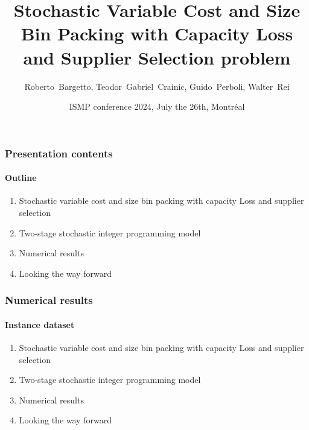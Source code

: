 \documentclass[8pt,xcolor={dvipsnames}]{beamer}
\title[SVCSBPP-CL-SS]
{ \textbf { Stochastic Variable Cost and Size Bin Packing with Capacity Loss and Supplier Selection problem} }
\author[R.~Bargetto, T.~G.~Crainic, G.~Perboli, W.~Rei]
{Roberto~Bargetto, Teodor~Gabriel~Crainic, Guido~Perboli, Walter~Rei}
\institute[PoliTo]
{
	Politecnico di Torino
}
\date[ISMP conference 2024]{ISMP conference 2024, July the 26th, Montréal}
\begin{document}
 
\frame{\titlepage}
 
\begin{frame}
	\frametitle{Presentation contents}
	\framesubtitle{Outline}
	\begin{enumerate}
		\item Stochastic variable cost and size bin packing with capacity Loss and supplier selection
		\bigskip
		\item Two-stage stochastic integer programming model
		\bigskip
		\item Numerical results
		\bigskip
		\item Looking the way forward
	\end{enumerate}
\end{frame}

\begin{frame}
	\frametitle{Numerical results}
	\framesubtitle{Instance dataset}
	\begin{enumerate}
		\item Stochastic variable cost and size bin packing with capacity Loss and supplier selection
		\bigskip
		\item Two-stage stochastic integer programming model
		\bigskip
		\item Numerical results
		\bigskip
		\item Looking the way forward
	\end{enumerate}
\end{frame}
\end{document}
